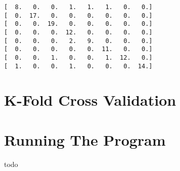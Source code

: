 \documentclass{article}
\begin{document}
\begin{center}
\begin{verbatim}
[  8.   0.   0.   1.   1.   1.   0.   0.]
[  0.  17.   0.   0.   0.   0.   0.   0.]
[  0.   0.  19.   0.   0.   0.   0.   0.]
[  0.   0.   0.  12.   0.   0.   0.   0.]
[  0.   0.   0.   2.   9.   0.   0.   0.]
[  0.   0.   0.   0.   0.  11.   0.   0.]
[  0.   0.   1.   0.   0.   1.  12.   0.]
[  1.   0.   0.   1.   0.   0.   0.  14.]
\end{verbatim}
\end{center}

\section*{K-Fold Cross Validation}

\section*{Running The Program}

todo
\end{document}
